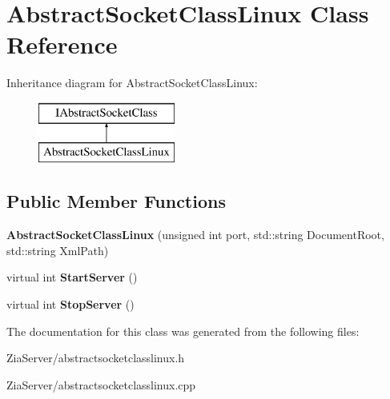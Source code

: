 \hypertarget{class_abstract_socket_class_linux}{
\section{AbstractSocketClassLinux Class Reference}
\label{class_abstract_socket_class_linux}
}
Inheritance diagram for AbstractSocketClassLinux:\begin{figure}[H]
\begin{center}
\leavevmode
\includegraphics[height=2.000000cm]{class_abstract_socket_class_linux}
\end{center}
\end{figure}
\subsection*{Public Member Functions}
\begin{DoxyCompactItemize}
\item 
\hypertarget{class_abstract_socket_class_linux_aad61b4acfa08c8001d5b9d82d18a04a4}{
{\bfseries AbstractSocketClassLinux} (unsigned int port, std::string DocumentRoot, std::string XmlPath)}
\label{class_abstract_socket_class_linux_aad61b4acfa08c8001d5b9d82d18a04a4}

\item 
\hypertarget{class_abstract_socket_class_linux_abdad7a97f3a4671b2ea56bf02f8e28cb}{
virtual int {\bfseries StartServer} ()}
\label{class_abstract_socket_class_linux_abdad7a97f3a4671b2ea56bf02f8e28cb}

\item 
\hypertarget{class_abstract_socket_class_linux_abd509af9a70b82794050e1b70ad09e20}{
virtual int {\bfseries StopServer} ()}
\label{class_abstract_socket_class_linux_abd509af9a70b82794050e1b70ad09e20}

\end{DoxyCompactItemize}


The documentation for this class was generated from the following files:\begin{DoxyCompactItemize}
\item 
ZiaServer/abstractsocketclasslinux.h\item 
ZiaServer/abstractsocketclasslinux.cpp\end{DoxyCompactItemize}
